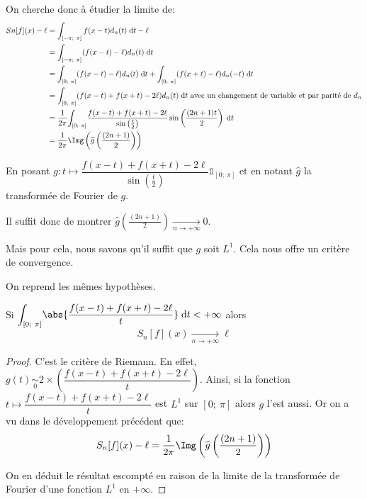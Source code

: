 On cherche donc à étudier la limite de:
\begin{align*}
Sn[f](x) - \ell & = \int_{[-\pi;~\pi]} f(x-t)d_n(t) \; \mathrm d t - \ell \\
 & = \int_{[-\pi;~\pi]} (f(x-t)-\ell)d_n(t) \; \mathrm d t \\
 & = \int_{[0;~\pi]} (f(x-t)-\ell)d_n(t) \; \mathrm d t + \int_{[0;~\pi]} (f(x+t)-\ell)d_n(-t) \; \mathrm d t \\
 & = \int_{[0;~\pi]} (f(x-t)+f(x+t)-2\ell)d_n(t) \; \mathrm d t \text{ avec un changement de variable et par parité de }d_n\\
 & = \frac{1}{2\pi} \displaystyle{\int_{[0;~\pi]}} \dfrac{f(x-t)+f(x+t)-2\ell}{\sin\left(\frac{t}{2}\right)} \sin \left ( \frac{(2n+1)t}{2}\right ) \; \mathrm d t \\
 & = \frac{1}{2\pi} \Img \left ( \widehat{g}\left ( \frac{(2n+1)}{2}\right ) \right )
\end{align*}

En posant $g: t \mapsto \dfrac{f(x-t)+f(x+t)-2\ell}{\sin\left(\frac{t}{2}\right)} \mathbb{1}_{[0;~\pi]}$ et en notant $\widehat{g}$ la transformée de Fourier de $g$.

Il suffit donc de montrer $\widehat{g}\left ( \frac{(2n+1)}{2}\right ) \underset{n \to +\infty}{\longrightarrow} 0$.

Mais pour cela, nous savons qu'il suffit que $g$ soit $L^1$. Cela nous offre un critère de convergence.

\begin{theo}
On reprend les mêmes hypothèses.

Si $ \displaystyle{\int_{[0;~\pi]}} \abs{\dfrac{f(x-t)+f(x+t)-2\ell}{t}} \; \mathrm d t < +\infty$ alors 
\[
S_n[f](x) \underset{n \to +\infty}{\longrightarrow} \ell
\]
\end{theo}


\begin{proof}
C'est le critère de Riemann. En effet, $g(t) \underset{0}{\sim} 2 \times \left (\dfrac{f(x-t)+f(x+t)-2\ell}{t}\right )$. Ainsi, si la fonction $t \mapsto \dfrac{f(x-t)+f(x+t)-2\ell}{t}$ est $L^1$ sur $[0;~\pi]$ alors $g$ l'est aussi. Or on a vu dans le développement précédent que:
\[
S_n[f](x) - \ell = \frac{1}{2\pi} \Img \left ( \widehat{g}\left ( \frac{(2n+1)}{2}\right ) \right )
\]

On en déduit le résultat escompté en raison de la limite de la transformée de Fourier d'une fonction $L^1$ en $+\infty$.
\end{proof}


